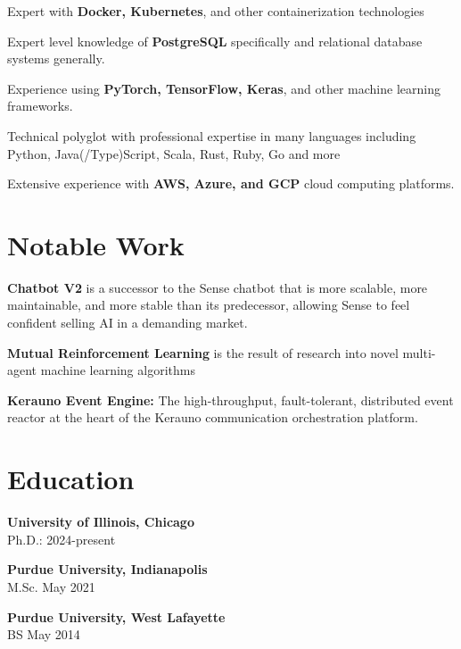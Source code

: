 \documentclass[11pt,letterpaper]{article}
\begin{document}
\begin{paracol}{2}
	Expert with \textbf{Docker, Kubernetes}, and other containerization technologies

	\vspace{0.1in}

	Expert level knowledge of \textbf{PostgreSQL} specifically and relational database systems generally.

	\vspace{0.1in}

	Experience using \textbf{PyTorch, TensorFlow, Keras}, and other machine learning frameworks.

	\vspace{0.1in}

	Technical polyglot with professional expertise in many languages including Python, Java(/Type)Script, Scala, Rust, Ruby, Go and more

	\vspace{0.1in}
	Extensive experience with \textbf{AWS, Azure, and GCP} cloud computing platforms.

\vspace{0.2in}

\section{Notable Work}

\textbf{Chatbot V2} is a successor to the Sense chatbot that is more scalable, more maintainable, and more stable than its predecessor, allowing Sense to feel confident selling AI in a demanding market.

\vspace{0.1in}

\textbf{Mutual Reinforcement Learning} is the result of research into novel multi-agent machine learning algorithms

\vspace{0.1in}

\textbf{Kerauno Event Engine:} The high-throughput, fault-tolerant, distributed event reactor at the heart of the Kerauno communication orchestration platform.

\vspace{0.2in}

\section{Education}

\textbf{University of Illinois, Chicago} \\
Ph.D.: 2024-present

\vspace{0.1in}

\textbf{Purdue University, Indianapolis} \\
M.Sc. May 2021

\vspace{0.1in}

\textbf{Purdue University, West Lafayette} \\
	BS May 2014

\end{paracol}
\end{document}
